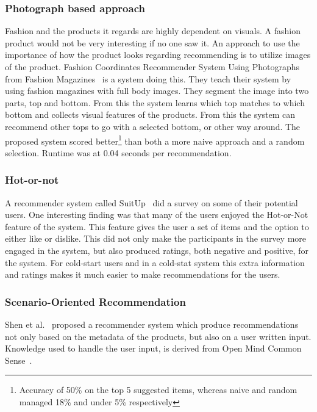 \subsubsection{Photograph based approach}
    Fashion and the products it regards are highly dependent on visuals.  A fashion
    product would not be very interesting if no one saw it.  An approach to use the
    importance of how the product looks regarding recommending is to utilize images
    of the product.  Fashion Coordinates Recommender System Using Photographs from
    Fashion Magazines~\cite{Iwata:2011} is a system doing this.  They teach their
    system by using fashion magazines with full body images.  They segment the
    image into two parts, top and bottom.  From this the system learns which top
    matches to which bottom and collects visual features of the products.  From
    this the system can recommend other tops to go with a selected bottom, or other
    way around.  The proposed system scored better\footnote{Accuracy of 50\% on the
    top 5 suggested items, whereas naive and random managed 18\% and under 5\%
    respectively} than both a more naive approach and a random selection.  Runtime
    was at 0.04 seconds per recommendation.

\subsubsection{Hot-or-not}
    A recommender system called SuitUp~\cite{SuitUp} did a survey on some of their potential users.
    One interesting finding was that many of the users enjoyed the Hot-or-Not feature of the system.
    This feature gives the user a set of items and the option to either like or dislike.
    This did not only make the participants in the survey more engaged in the system, but also produced ratings, both negative and positive, for the system.
    For cold-start users and in a cold-stat system this extra information and ratings makes it much easier to make recommendations for the users.

\subsubsection{Scenario-Oriented Recommendation}
    Shen et al.~\cite{Shen:2007:AIG:1216295.1216368} proposed a recommender system which produce recommendations not only based on the metadata of the products, but also on a user written input.
    Knowledge used to handle the user input, is derived from Open Mind Common Sense~\cite{Singh02openmind}.

